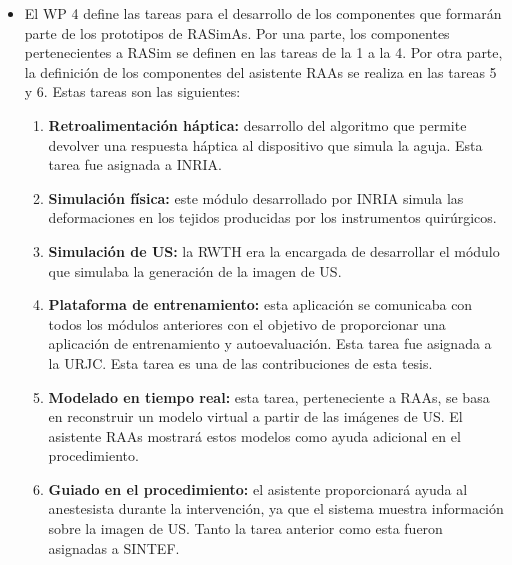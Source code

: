 \begin{itemize}
\item
El \ac{WP} 4 define las tareas para el desarrollo de los componentes que formarán parte de los prototipos de \ac{RASimAs}. Por una parte, los componentes pertenecientes a \ac{RASim} se definen en las tareas de la 1 a la 4. Por otra parte, la definición de los componentes del asistente \ac{RAAs} se realiza en las tareas 5 y 6. Estas tareas son las siguientes:

\begin{enumerate}
    \item \textbf{Retroalimentación háptica:}
    desarrollo del algoritmo que permite devolver una respuesta háptica al dispositivo que simula la aguja. Esta tarea fue asignada a \ac{INRIA}.
    \item \textbf{Simulación física:}
    este módulo desarrollado por \ac{INRIA} simula las deformaciones en los tejidos producidas por los instrumentos quirúrgicos.
    \item \textbf{Simulación de \ac{US}:}
    la \ac{RWTH} era la encargada de desarrollar el módulo que simulaba la generación de la imagen de \ac{US}.
    \item \textbf{Plataforma de entrenamiento:}
    esta aplicación se comunicaba con todos los módulos anteriores con el objetivo de proporcionar una aplicación de entrenamiento y autoevaluación. Esta tarea fue asignada a la \ac{URJC}. Esta tarea es una de las contribuciones de esta tesis.
    \item \textbf{Modelado en tiempo real:} esta tarea, perteneciente a \ac{RAAs}, se basa en reconstruir un modelo virtual a partir de las imágenes de \ac{US}. El asistente \ac{RAAs} mostrará estos modelos como ayuda adicional en el procedimiento.
    \item \textbf{Guiado en el procedimiento:}
    el asistente proporcionará ayuda al anestesista durante la intervención, ya que el sistema muestra información sobre la imagen de \ac{US}.
    Tanto la tarea anterior como esta fueron asignadas a \ac{SINTEF}.
\end{enumerate}


\end{itemize}
